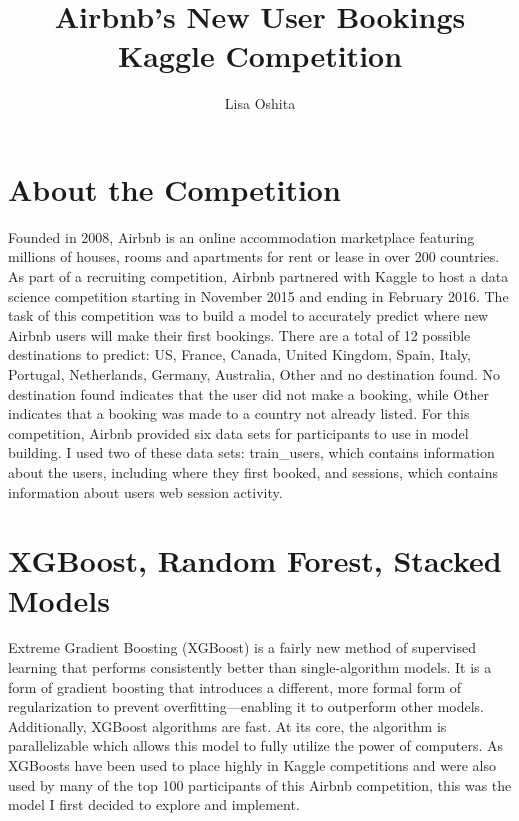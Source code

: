 \documentclass{article}
\title{Airbnb's New User Bookings Kaggle Competition}
\author{Lisa Oshita}
\begin{document}


\maketitle

\section{About the Competition}


Founded in 2008, Airbnb is an online accommodation marketplace featuring millions of houses,
rooms and apartments for rent or lease in over 200 countries. As part of a recruiting competition,
Airbnb partnered with Kaggle to host a data science competition starting in November 2015 and ending
in February 2016. The task of this competition was to build a model to accurately predict where new
Airbnb users will make their first bookings. There are a total of 12 possible destinations to predict:
US, France, Canada, United Kingdom, Spain, Italy, Portugal, Netherlands, Germany, Australia, Other and
no destination found. No destination found indicates that the user did not make a booking, while Other
indicates that a booking was made to a country not already listed. For this competition, Airbnb provided
six data sets for participants to use in model building. I used two of these data sets: train\_users,
which contains information about the users, including where they first booked, and sessions, which contains
information about user\textquotesingle s web session activity.

\section{XGBoost, Random Forest, Stacked Models}

Extreme Gradient Boosting (XGBoost) is a fairly new method of supervised learning that performs consistently 
better than single-algorithm models. It is a form of gradient boosting that introduces a different, more 
formal form of regularization to prevent overfitting---enabling it to outperform other models. Additionally, 
XGBoost algorithms are fast. At its core, the algorithm is parallelizable which allows this model to fully 
utilize the power of computers. As XGBoosts have been used to place highly in Kaggle competitions and were 
also used by many of the top 100 participants of this Airbnb competition, this was the model I first decided 
to explore and implement. 
\end{document}
